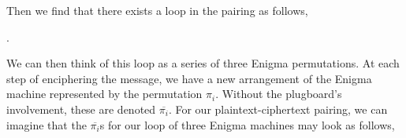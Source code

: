 \noindent Then we find that there exists a loop in the pairing as follows,

\begin{center}
  .
\end{center}
We can then think of this loop as a series of three Enigma
permutations. At each step of enciphering the message, we have a new
arrangement of the Enigma machine represented by the permutation
$\pi_i$. Without the plugboard's involvement, these are denoted
$\overline{\pi_i}$. For our plaintext-ciphertext pairing, we can
imagine that the $\overline{\pi_i}$s for our loop of three Enigma
machines may look as follows,
